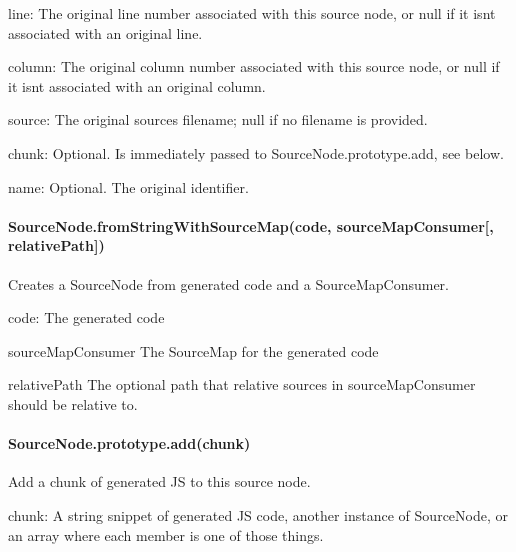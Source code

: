 \begin{DoxyItemize}
\item {\ttfamily line}\+: The original line number associated with this source node, or null if it isn\textquotesingle{}t associated with an original line.
\item {\ttfamily column}\+: The original column number associated with this source node, or null if it isn\textquotesingle{}t associated with an original column.
\item {\ttfamily source}\+: The original source\textquotesingle{}s filename; null if no filename is provided.
\item {\ttfamily chunk}\+: Optional. Is immediately passed to {\ttfamily Source\+Node.\+prototype.\+add}, see below.
\item {\ttfamily name}\+: Optional. The original identifier.
\end{DoxyItemize}

\paragraph*{Source\+Node.\+from\+String\+With\+Source\+Map(code, source\+Map\+Consumer\mbox{[}, relative\+Path\mbox{]})}

Creates a Source\+Node from generated code and a Source\+Map\+Consumer.


\begin{DoxyItemize}
\item {\ttfamily code}\+: The generated code
\item {\ttfamily source\+Map\+Consumer} The Source\+Map for the generated code
\item {\ttfamily relative\+Path} The optional path that relative sources in {\ttfamily source\+Map\+Consumer} should be relative to.
\end{DoxyItemize}

\paragraph*{Source\+Node.\+prototype.\+add(chunk)}

Add a chunk of generated JS to this source node.


\begin{DoxyItemize}
\item {\ttfamily chunk}\+: A string snippet of generated JS code, another instance of {\ttfamily Source\+Node}, or an array where each member is one of those things.
\end{DoxyItemize}

